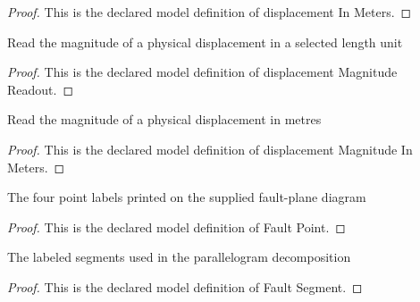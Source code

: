 \begin{proof}
  This is the declared model definition of displacement In Meters.
\end{proof}
\begin{definition}
  \label{def:physics:phyx-mini-0735:phyxminiproblems-problemphyxmini0735-displacementmagnitudereadout}
  Read the magnitude of a physical displacement in a selected length unit
\end{definition}
\begin{proof}
  This is the declared model definition of displacement Magnitude Readout.
\end{proof}
\begin{definition}
  \label{def:physics:phyx-mini-0735:phyxminiproblems-problemphyxmini0735-displacementmagnitudeinmeters}
  Read the magnitude of a physical displacement in metres
\end{definition}
\begin{proof}
  This is the declared model definition of displacement Magnitude In Meters.
\end{proof}
\begin{definition}
  \label{def:physics:phyx-mini-0735:phyxminiproblems-problemphyxmini0735-faultpoint}
  The four point labels printed on the supplied fault-plane diagram
\end{definition}
\begin{proof}
  This is the declared model definition of Fault Point.
\end{proof}
\begin{definition}
  \label{def:physics:phyx-mini-0735:phyxminiproblems-problemphyxmini0735-faultsegment}
  The labeled segments used in the parallelogram decomposition
\end{definition}
\begin{proof}
  This is the declared model definition of Fault Segment.
\end{proof}
